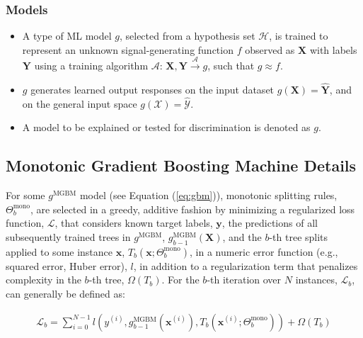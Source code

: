 \documentclass[information,article,accept,moreauthors,pdftex]{Definitions/mdpi}
\begin{document}
{\subsubsection{Models}

\begin{itemize}[leftmargin=*,labelsep=5.8mm]
	\item A type of ML model $g$, selected from a hypothesis set $\mathcal{H}$, is trained to represent an unknown signal-generating function $f$ observed as  $\mathbf{X}$ with labels $\mathbf{Y}$ using a training algorithm $\mathcal{A}$: 
	$ \mathbf{X}, \mathbf{Y} \xrightarrow{\mathcal{A}} g$, such that $g \approx f$.
	\item $g$ generates learned output responses on the input dataset $g(\mathbf{X}) = \mathbf{\hat{Y}}$, and on the general input space $g(\mathcal{X}) = \mathcal{\hat{Y}}$.
	\item A model to be explained or tested for discrimination is denoted as $g$.
\end{itemize}

\subsection{Monotonic Gradient Boosting Machine Details}\label{a_ssec:mgbm}

 For some $g^\text{MGBM}$ model (see Equation (\ref{eq:gbm})), monotonic splitting rules, $\Theta^{\text{mono}}_b$, are selected in a greedy, additive fashion by minimizing a regularized loss function, $\mathcal{L}$,  that considers known target labels, $\mathbf{y}$, the predictions of all subsequently trained trees in $g^{\text{MGBM}}$, $g^{\text{MGBM}}_{b-1}(\mathbf{X})$, and the $b$-th tree splits applied to some instance $\mathbf{x}$, $T_b(\mathbf{x};\Theta^\text{mono}_b)$, in a numeric error function (e.g., squared error, Huber error), $l$, in addition to a regularization term that penalizes complexity in the $b$-th tree, $\Omega(T_b)$. For the $b$-th iteration over $N$ instances, $\mathcal{L}_{b}$, can generally be defined as:

\begin{equation}
\begin{aligned}
\mathcal{L}_{b} =\sum_{i=0}^{N-1}l(y^{(i)}, g^{\text{MGBM}}_{b-1}(\mathbf{x}^{(i)}), T_b(\mathbf{x}^{(i)};\Theta^\text{mono}_b)) + \Omega(T_b)\\
\end{aligned}
\end{equation}

}
\end{document}
